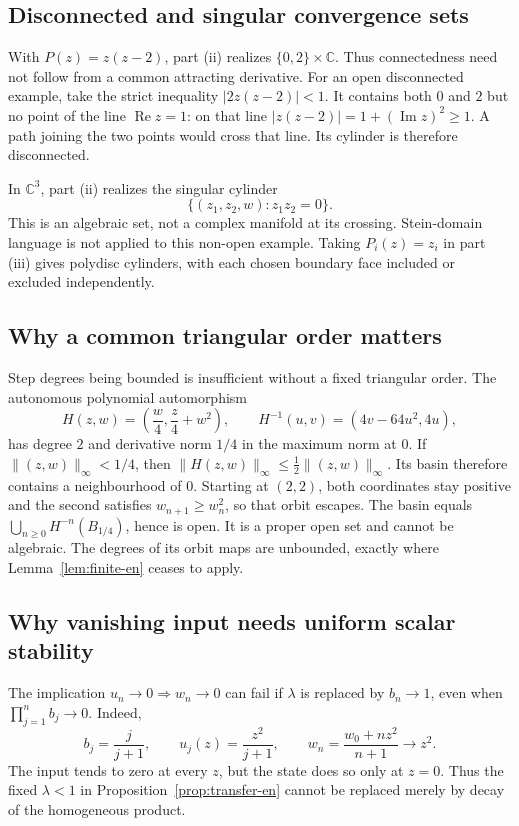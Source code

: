 \documentclass[12pt]{amsart}
\theoremstyle{definition}
\theoremstyle{remark}
\numberwithin{equation}{section}
\newcommand{\C}{\mathbb{C}}
\begin{document}
\subsection{Disconnected and singular convergence sets}
With $P(z)=z(z-2)$, part (ii) realizes $\{0,2\}\times\C$. Thus connectedness need not follow from a common attracting derivative. For an open disconnected example, take the strict inequality $|2z(z-2)|<1$. It contains both $0$ and $2$ but no point of the line $\operatorname{Re}z=1$: on that line $|z(z-2)|=1+(\operatorname{Im}z)^2\geq1$. A path joining the two points would cross that line. Its cylinder is therefore disconnected.

In $\C^3$, part (ii) realizes the singular cylinder
\[
\{(z_1,z_2,w):z_1z_2=0\}.
\]
This is an algebraic set, not a complex manifold at its crossing. Stein-domain language is not applied to this non-open example. Taking $P_i(z)=z_i$ in part (iii) gives polydisc cylinders, with each chosen boundary face included or excluded independently.

\subsection{Why a common triangular order matters}
Step degrees being bounded is insufficient without a fixed triangular order. The autonomous polynomial automorphism
\[
H(z,w)=\left(\frac w4,\frac z4+w^2\right),\qquad
H^{-1}(u,v)=(4v-64u^2,4u),
\]
has degree $2$ and derivative norm $1/4$ in the maximum norm at $0$. If $\|(z,w)\|_\infty<1/4$, then $\|H(z,w)\|_\infty\leq\tfrac12\|(z,w)\|_\infty$. Its basin therefore contains a neighbourhood of $0$. Starting at $(2,2)$, both coordinates stay positive and the second satisfies $w_{n+1}\geq w_n^2$, so that orbit escapes. The basin equals $\bigcup_{n\geq0}H^{-n}(B_{1/4})$, hence is open. It is a proper open set and cannot be algebraic. The degrees of its orbit maps are unbounded, exactly where Lemma~\ref{lem:finite-en} ceases to apply.

\subsection{Why vanishing input needs uniform scalar stability}
The implication $u_n\to0\Rightarrow w_n\to0$ can fail if $\lambda$ is replaced by $b_n\to1$, even when $\prod_{j=1}^n b_j\to0$. Indeed,
\[
b_j=\frac j{j+1},\qquad u_j(z)=\frac{z^2}{j+1},\qquad
w_n=\frac{w_0+nz^2}{n+1}\longrightarrow z^2.
\]
The input tends to zero at every $z$, but the state does so only at $z=0$. Thus the fixed $\lambda<1$ in Proposition~\ref{prop:transfer-en} cannot be replaced merely by decay of the homogeneous product.
\end{document}

